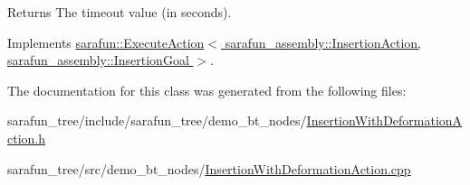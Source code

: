 \begin{DoxyReturn}{Returns}
The timeout value (in seconds). 
\end{DoxyReturn}


Implements \hyperlink{classsarafun_1_1ExecuteAction_aba6cfa8a8ce19e735eb6394424df6d17}{sarafun\-::\-Execute\-Action$<$ sarafun\-\_\-assembly\-::\-Insertion\-Action, sarafun\-\_\-assembly\-::\-Insertion\-Goal $>$}.



The documentation for this class was generated from the following files\-:\begin{DoxyCompactItemize}
\item 
sarafun\-\_\-tree/include/sarafun\-\_\-tree/demo\-\_\-bt\-\_\-nodes/\hyperlink{InsertionWithDeformationAction_8h}{Insertion\-With\-Deformation\-Action.\-h}\item 
sarafun\-\_\-tree/src/demo\-\_\-bt\-\_\-nodes/\hyperlink{InsertionWithDeformationAction_8cpp}{Insertion\-With\-Deformation\-Action.\-cpp}\end{DoxyCompactItemize}
